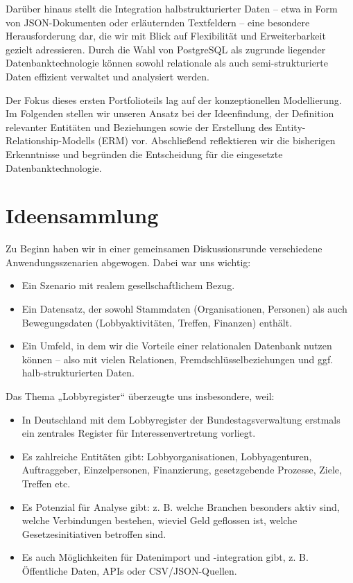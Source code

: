 \documentclass[12pt,twoside=false,a4paper,parskip]{scrbook}
\begin{document}
Darüber hinaus stellt die Integration halbstrukturierter Daten – etwa in Form von JSON-Dokumenten oder erläuternden Textfeldern – eine besondere Herausforderung dar, die wir mit Blick auf Flexibilität und Erweiterbarkeit gezielt adressieren. Durch die Wahl von PostgreSQL als zugrunde liegender Datenbanktechnologie können sowohl relationale als auch semi-strukturierte Daten effizient verwaltet und analysiert werden.

Der Fokus dieses ersten Portfolioteils lag auf der konzeptionellen Modellierung. Im Folgenden stellen wir unseren Ansatz bei der Ideenfindung, der Definition relevanter Entitäten und Beziehungen sowie der Erstellung des Entity-Relationship-Modells (ERM) vor. Abschließend reflektieren wir die bisherigen Erkenntnisse und begründen die Entscheidung für die eingesetzte Datenbanktechnologie.

\chapter{Ideensammlung}
Zu Beginn haben wir in einer gemeinsamen Diskussionsrunde verschiedene Anwendungsszenarien abgewogen. Dabei war uns wichtig:

\begin{itemize}
\item Ein Szenario mit realem gesellschaftlichem Bezug.
\item Ein Datensatz, der sowohl Stammdaten (Organisationen, Personen) als auch Bewegungsdaten (Lobbyaktivitäten, Treffen, Finanzen) enthält.
\item Ein Umfeld, in dem wir die Vorteile einer relationalen Datenbank nutzen können – also mit vielen Relationen, Fremdschlüsselbeziehungen und ggf. halb-strukturierten Daten.
\end{itemize}

Das Thema „Lobbyregister“ überzeugte uns insbesondere, weil:

\begin{itemize}
\item In Deutschland mit dem Lobbyregister der Bundestagsverwaltung erstmals ein zentrales Register für Interessenvertretung vorliegt.
\item Es zahlreiche Entitäten gibt: Lobbyorganisationen, Lobbyagenturen, Auftraggeber, Einzelpersonen, Finanzierung, gesetzgebende Prozesse, Ziele, Treffen etc.
\item Es Potenzial für Analyse gibt: z. B. welche Branchen besonders aktiv sind, welche Verbindungen bestehen, wieviel Geld geflossen ist, welche Gesetzesinitiativen betroffen sind.
\item Es auch Möglichkeiten für Datenimport und -integration gibt, z. B. Öffentliche Daten, APIs oder CSV/JSON-Quellen.
\end{itemize}
\end{document}
